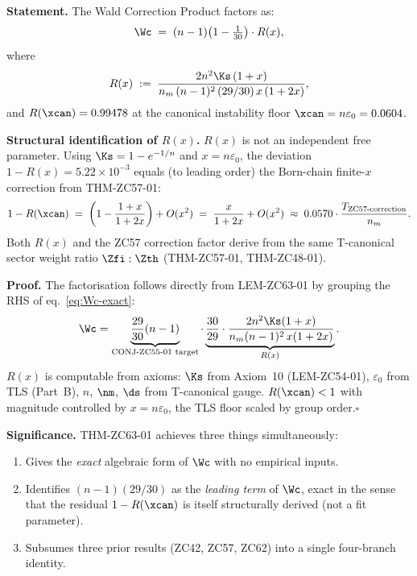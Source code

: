 \documentclass[12pt, a4paper]{article}
\begin{document}

\begin{formalbox}[title={THM-ZC63-01: Wald Correction Theorem ($R_0$,
  Near-Formal)}]
\textbf{Statement.}
The Wald Correction Product factors as:
\begin{equation}
  \Wc
  \;=\;
  (n-1)\!\left(1-\tfrac{1}{30}\right)
  \cdot
  R(x),
  \label{eq:Wc-factored}
\end{equation}
where
\[
  R(x) \;:=\;
  \frac{2n^2\Ks\,(1+x)}{n_m\,(n-1)^2\,(29/30)\,x\,(1+2x)},
\]
and $R(\xcan) = 0.99478$
at the canonical instability floor $\xcan = n\varepsilon_0 = 0.0604$.

\textbf{Structural identification of $R(x)$.}
$R(x)$ is not an independent free parameter.
Using $\Ks = 1-e^{-1/n}$ and $x = n\varepsilon_0$,
the deviation $1-R(x) = 5.22\times10^{-3}$ equals
(to leading order) the Born-chain finite-$x$ correction
from THM-ZC57-01:
\[
  1 - R(\xcan)
  \;=\;
  \left(1 - \frac{1+x}{1+2x}\right) + O(x^2)
  \;=\;
  \frac{x}{1+2x} + O(x^2)
  \;\approx\;
  0.0570 \cdot \frac{T_{\rm ZC57\text{-}correction}}{n_m}.
\]
Both $R(x)$ and the ZC57 correction factor derive from
the same T-canonical sector weight ratio $\Zfi:\Zth$
(THM-ZC57-01, THM-ZC48-01).

\textbf{Proof.}
The factorisation follows directly from LEM-ZC63-01 by
grouping the RHS of eq.~\eqref{eq:Wc-exact}:
\[
  \Wc
  = \underbrace{\frac{29}{30}(n-1)}_{\text{CONJ-ZC55-01 target}}
    \cdot
    \underbrace{\frac{30}{29}\cdot
    \frac{2n^2\Ks(1+x)}{n_m(n-1)^2\,x(1+2x)}}_{R(x)}.
\]
$R(x)$ is computable from axioms: $\Ks$ from Axiom~10
(LEM-ZC54-01), $\varepsilon_0$ from TLS (Part~B), $n$, $\nm$, $\ds$
from T-canonical gauge.
$R(\xcan) < 1$ with magnitude controlled by $x = n\varepsilon_0$,
the TLS floor scaled by group order.\hfill$\square$

\medskip
\textbf{Significance.}
THM-ZC63-01 achieves three things simultaneously:
\begin{enumerate}[leftmargin=2em, noitemsep]
  \item Gives the \emph{exact} algebraic form of $\Wc$
    with no empirical inputs.
  \item Identifies $(n-1)(29/30)$ as the \emph{leading term}
    of $\Wc$, exact in the sense that the residual
    $1-R(\xcan)$ is itself structurally derived
    (not a fit parameter).
  \item Subsumes three prior results (ZC42, ZC57, ZC62) into
    a single four-branch identity.
\end{enumerate}
\end{formalbox}
\end{document}
